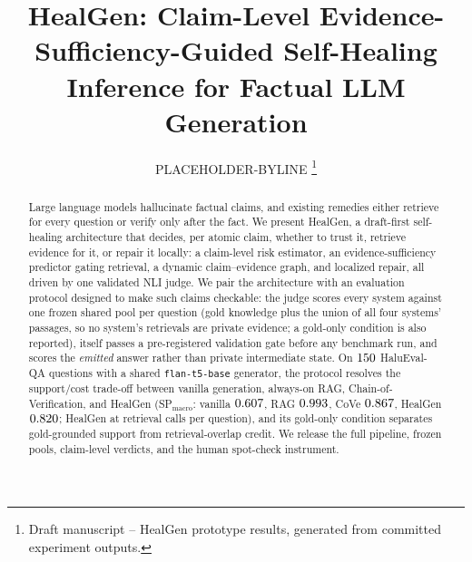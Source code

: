 \documentclass[conference]{IEEEtran}
\title{HealGen: Claim-Level Evidence-Sufficiency-Guided Self-Healing
Inference for Factual LLM Generation}
\author{ PLACEHOLDER-BYLINE
\thanks{Draft manuscript -- HealGen prototype results, generated from
committed experiment outputs.}}
\begin{document}

\maketitle

\begin{abstract}
Large language models hallucinate factual claims, and existing remedies
either retrieve for every question or verify only after the fact.  We
present HealGen, a draft-first self-healing architecture that decides,
per atomic claim, whether to trust it, retrieve evidence for it, or
repair it locally: a claim-level risk estimator, an evidence-sufficiency
predictor gating retrieval, a dynamic claim--evidence graph, and
localized repair, all driven by one validated NLI judge.  We pair the
architecture with an evaluation protocol designed to make such claims
checkable: the judge scores every system against one frozen shared pool
per question (gold knowledge plus the union of all four systems'
passages, so no system's retrievals are private evidence; a gold-only
condition is also reported), itself passes a pre-registered validation
gate before any benchmark run, and scores the \emph{emitted} answer
rather than private intermediate
state.  On $150$ HaluEval-QA questions with a shared
\texttt{flan-t5-base} generator, the protocol resolves the support/cost
trade-off between vanilla generation, always-on RAG, Chain-of-Verification,
and HealGen (SP$_{\text{macro}}$: vanilla $0.607$, RAG $0.993$,
CoVe $0.867$, HealGen $0.820$; HealGen at \RetrHealGen{} retrieval
calls per question), and its gold-only condition separates
gold-grounded support from retrieval-overlap credit.  We release the full
pipeline, frozen pools, claim-level verdicts, and the human
spot-check instrument.
\end{abstract}












\end{document}
